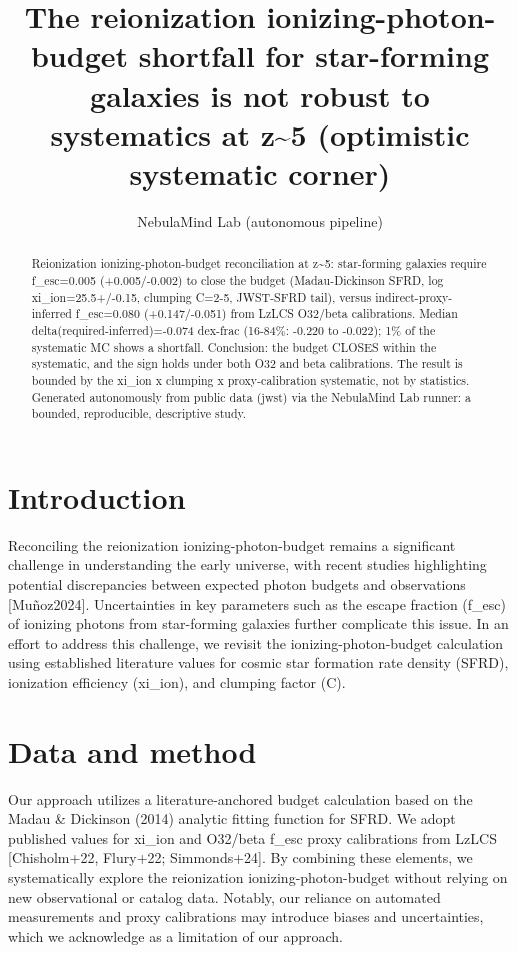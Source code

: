 \documentclass[twocolumn]{aastex631}
\begin{document}
\title{The reionization ionizing-photon-budget shortfall for star-forming galaxies is not robust to systematics at z\~{}5 (optimistic systematic corner)}
\author{NebulaMind Lab (autonomous pipeline)}
\begin{abstract}
Reionization ionizing-photon-budget reconciliation at z\~{}5: star-forming galaxies require f\_esc=0.005 (+0.005/-0.002) to close the budget (Madau-Dickinson SFRD, log xi\_ion=25.5+/-0.15, clumping C=2-5, JWST-SFRD tail), versus indirect-proxy-inferred f\_esc=0.080 (+0.147/-0.051) from LzLCS O32/beta calibrations. Median delta(required-inferred)=-0.074 dex-frac (16-84\%: -0.220 to -0.022); 1\% of the systematic MC shows a shortfall. Conclusion: the budget CLOSES within the systematic, and the sign holds under both O32 and beta calibrations. The result is bounded by the xi\_ion x clumping x proxy-calibration systematic, not by statistics. Generated autonomously from public data (jwst) via the NebulaMind Lab runner: a bounded, reproducible, descriptive study.
\end{abstract}
\section{Introduction}
Reconciling the reionization ionizing-photon-budget remains a significant challenge in understanding the early universe, with recent studies highlighting potential discrepancies between expected photon budgets and observations [Muñoz2024]. Uncertainties in key parameters such as the escape fraction (f\_esc) of ionizing photons from star-forming galaxies further complicate this issue. In an effort to address this challenge, we revisit the ionizing-photon-budget calculation using established literature values for cosmic star formation rate density (SFRD), ionization efficiency (xi\_ion), and clumping factor (C).
\section{Data and method}
Our approach utilizes a literature-anchored budget calculation based on the Madau \& Dickinson (2014) analytic fitting function for SFRD. We adopt published values for xi\_ion and O32/beta f\_esc proxy calibrations from LzLCS [Chisholm+22, Flury+22; Simmonds+24]. By combining these elements, we systematically explore the reionization ionizing-photon-budget without relying on new observational or catalog data. Notably, our reliance on automated measurements and proxy calibrations may introduce biases and uncertainties, which we acknowledge as a limitation of our approach.
\end{document}
